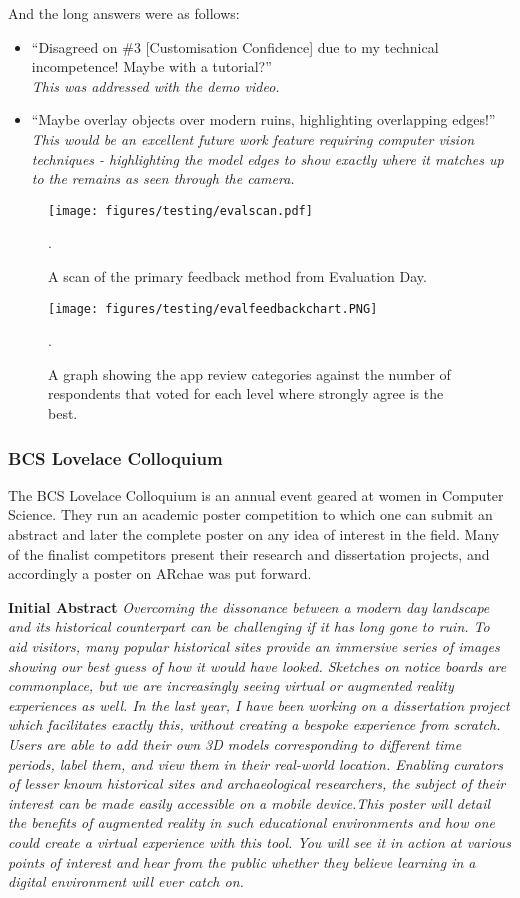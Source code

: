 \documentclass[12pt, a4paper]{article}
\begin{document}
And the long answers were as follows:
\begin{itemize}
    \item ``Disagreed on \#3 [Customisation Confidence] due to my technical incompetence! Maybe with a tutorial?''\\
    \textit{This was addressed with the demo video.}
    \item ``Maybe overlay objects over modern ruins, highlighting overlapping edges!'' \\
    \textit{This would be an excellent future work feature requiring computer vision techniques - highlighting the model edges to show exactly where it matches up to the remains as seen through the camera.}
\end{itemize}

\begin{figure}
    \texttt{[image: figures/testing/evalscan.pdf]}
        \caption{A scan of the primary feedback method from Evaluation Day.}.
        \label{fig:evalscan}
\end{figure}

\begin{figure}
    \texttt{[image: figures/testing/evalfeedbackchart.PNG]}
        \caption{A graph showing the app review categories against the number of respondents that voted for each level where strongly agree is the best.}.
        \label{fig:evalplot}
\end{figure}

\subsubsection{BCS Lovelace Colloquium}
The BCS Lovelace Colloquium is an annual event geared at women in Computer Science. They run an academic poster competition to which one can submit an abstract and later the complete poster on any idea of interest in the field. Many of the finalist competitors present their research and dissertation projects, and accordingly a poster on ARchae was put forward. 

\textbf{Initial Abstract} \textit{Overcoming the dissonance between a modern day landscape and its historical counterpart can be challenging if it has long gone to ruin. To aid visitors, many popular historical sites provide an immersive series of images showing our best guess of how it would have looked. Sketches on notice boards are commonplace, but we are increasingly seeing virtual or augmented reality experiences as well. In the last year, I have been working on a dissertation project which facilitates exactly this, without creating a bespoke experience from scratch. Users are able to add their own 3D models corresponding to different time periods, label them, and view them in their real-world location. Enabling curators of lesser known historical sites and archaeological researchers, the subject of their interest can be made easily accessible on a mobile device.This poster will detail the benefits of augmented reality in such educational environments and how one could create a virtual experience with this tool. You will see it in action at various points of interest and hear from the public whether they believe learning in a digital environment will ever catch on.}
\end{document}
